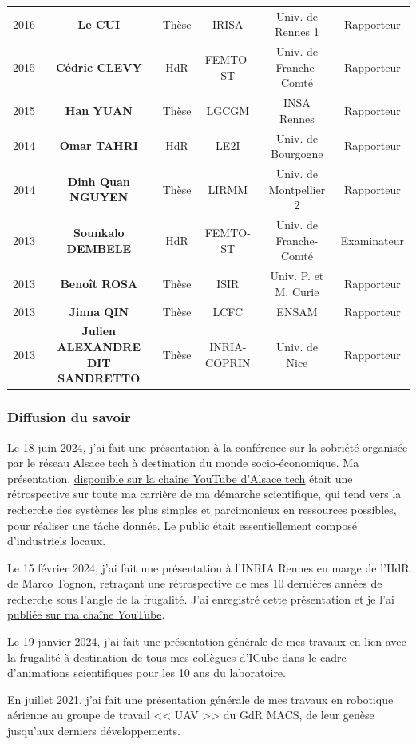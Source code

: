 \documentclass[a4paper,12pt]{article}
\begin{document}
{\begin{tabular}{cccccc}
2016 & \bf{Le CUI}  & Thèse & IRISA & Univ. de Rennes 1 & Rapporteur \\
2015 & \bf{Cédric CLEVY}  & HdR & FEMTO-ST & Univ. de Franche-Comté & Rapporteur \\
2015 & \bf{Han YUAN}  & Thèse & LGCGM & INSA Rennes & Rapporteur \\
2014 & \bf{Omar TAHRI} & HdR & LE2I & Univ. de Bourgogne & Rapporteur \\
2014 & \bf{Dinh Quan NGUYEN}  & Thèse & LIRMM & Univ. de Montpellier 2 & Rapporteur \\
2013 & \bf{Sounkalo DEMBELE}  & HdR & FEMTO-ST & Univ. de Franche-Comté & Examinateur \\
2013 & \bf{Benoît ROSA}  & Thèse & ISIR & Univ. P. et M. Curie & Rapporteur \\
2013 & \bf{Jinna QIN}  & Thèse & LCFC & ENSAM & Rapporteur \\
2013 & \bf{Julien ALEXANDRE DIT SANDRETTO}  & Thèse & INRIA-COPRIN & Univ. de Nice & Rapporteur \\ \bottomrule
\end{tabular}
}

\subsubsection{Diffusion du savoir}

Le 18 juin 2024, j'ai fait une présentation à la conférence sur la sobriété organisée par le réseau Alsace tech à destination du monde socio-économique. Ma présentation, \href{https://youtu.be/kJXx7LR21H4?t=2701}{disponible sur la chaîne YouTube d'Alsace tech} était une rétrospective sur toute ma carrière de ma démarche scientifique, qui tend vers la recherche des systèmes les plus simples et parcimonieux en ressources possibles, pour réaliser une tâche donnée. Le public était essentiellement composé d'industriels locaux.

Le 15 février 2024, j'ai fait une présentation à l'INRIA Rennes en marge de l'HdR de Marco Tognon, retraçant une rétrospective de mes 10 dernières années de recherche sous l'angle de la frugalité. J'ai enregistré cette présentation et je l'ai \href{https://youtu.be/ThW7nigN9hQ}{publiée sur ma chaîne YouTube}.

Le 19 janvier 2024, j'ai fait une présentation générale de mes travaux en lien avec la frugalité à destination de tous mes collègues d'ICube dans le cadre d'animations scientifiques pour les 10 ans du laboratoire.

En juillet 2021, j'ai fait une présentation générale de mes travaux en robotique aérienne au groupe de travail << UAV >> du GdR MACS, de leur genèse jusqu'aux derniers développements.
\end{document}
